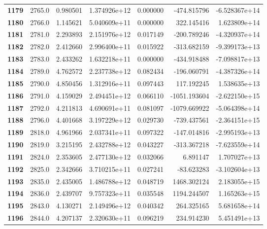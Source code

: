 \documentclass{report}[12pt]
\begin{document}
\begin{center}
\begin{tabular}{lrrrrrr}
\textbf{1179} &         2765.0 &   0.980501 &  1.374926e+12 &    0.000000 &  -474.815796 & -6.528367e+14 \\
\textbf{1180} &         2766.0 &   1.145621 &  5.040609e+11 &    0.000000 &   322.145416 &  1.623809e+14 \\
\textbf{1181} &         2781.0 &   2.293893 &  2.151976e+12 &    0.017149 &  -200.789246 & -4.320937e+14 \\
\textbf{1182} &         2782.0 &   2.412660 &  2.996400e+11 &    0.015922 &  -313.682159 & -9.399173e+13 \\
\textbf{1183} &         2783.0 &   2.433262 &  1.632218e+11 &    0.000000 &  -434.918488 & -7.098817e+13 \\
\textbf{1184} &         2789.0 &   4.762572 &  2.237738e+12 &    0.082434 &  -196.060791 & -4.387326e+14 \\
\textbf{1185} &         2790.0 &   4.850456 &  1.312916e+11 &    0.097443 &   117.192245 &  1.538635e+13 \\
\textbf{1186} &         2791.0 &   4.159029 &  2.494451e+12 &    0.066110 & -1051.193604 & -2.622150e+15 \\
\textbf{1187} &         2792.0 &   4.211813 &  4.690691e+11 &    0.081097 & -1079.669922 & -5.064398e+14 \\
\textbf{1188} &         2796.0 &   4.401668 &  3.197229e+12 &    0.029730 &  -739.437561 & -2.364151e+15 \\
\textbf{1189} &         2818.0 &   4.961966 &  2.037341e+11 &    0.097322 &  -147.014816 & -2.995193e+13 \\
\textbf{1190} &         2819.0 &   3.215195 &  2.432788e+12 &    0.043227 &  -313.367218 & -7.623559e+14 \\
\textbf{1191} &         2824.0 &   2.353605 &  2.477130e+12 &    0.032066 &     6.891147 &  1.707027e+13 \\
\textbf{1192} &         2825.0 &   2.342666 &  3.710215e+11 &    0.027241 &   -83.623283 & -3.102604e+13 \\
\textbf{1193} &         2835.0 &   2.435005 &  1.486788e+12 &    0.048719 &  1468.302124 &  2.183055e+15 \\
\textbf{1194} &         2836.0 &   2.439707 &  9.757323e+11 &    0.035548 &  1194.244507 &  1.165263e+15 \\
\textbf{1195} &         2843.0 &   4.130271 &  2.149496e+12 &    0.040342 &   264.325165 &  5.681658e+14 \\
\textbf{1196} &         2844.0 &   4.207137 &  2.320630e+11 &    0.096219 &   234.914230 &  5.451491e+13 \\

\end{tabular}
\end{center}
\end{document}
